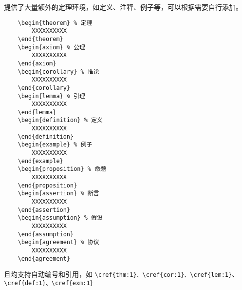 提供了大量额外的定理环境，如定义、注释、例子等，可以根据需要自行添加。
\begin{verbatim}
    \begin{theorem} % 定理
        XXXXXXXXXX
    \end{theorem}
    \begin{axiom} % 公理
        XXXXXXXXXX
    \end{axiom}
    \begin{corollary} % 推论
        XXXXXXXXXX
    \end{corollary}
    \begin{lemma} % 引理
        XXXXXXXXXX
    \end{lemma}
    \begin{definition} % 定义
        XXXXXXXXXX
    \end{definition}
    \begin{example} % 例子
        XXXXXXXXXX
    \end{example}
    \begin{proposition} % 命题
        XXXXXXXXXX
    \end{proposition}
    \begin{assertion} % 断言
        XXXXXXXXXX
    \end{assertion}
    \begin{assumption} % 假设
        XXXXXXXXXX
    \end{assumption}
    \begin{agreement} % 协议
        XXXXXXXXXX
    \end{agreement}
\end{verbatim}

且均支持自动编号和引用，如 \verb|\cref{thm:1}、\cref{cor:1}、\cref{lem:1}|、\verb|\cref{def:1}、\cref{exm:1}|



